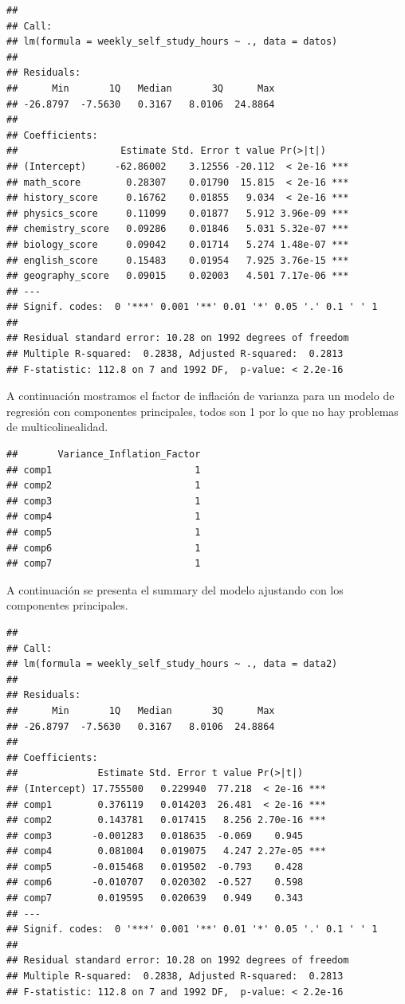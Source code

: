 \documentclass[
]{article}
\begin{document}
\begin{verbatim}
## 
## Call:
## lm(formula = weekly_self_study_hours ~ ., data = datos)
## 
## Residuals:
##      Min       1Q   Median       3Q      Max 
## -26.8797  -7.5630   0.3167   8.0106  24.8864 
## 
## Coefficients:
##                  Estimate Std. Error t value Pr(>|t|)    
## (Intercept)     -62.86002    3.12556 -20.112  < 2e-16 ***
## math_score        0.28307    0.01790  15.815  < 2e-16 ***
## history_score     0.16762    0.01855   9.034  < 2e-16 ***
## physics_score     0.11099    0.01877   5.912 3.96e-09 ***
## chemistry_score   0.09286    0.01846   5.031 5.32e-07 ***
## biology_score     0.09042    0.01714   5.274 1.48e-07 ***
## english_score     0.15483    0.01954   7.925 3.76e-15 ***
## geography_score   0.09015    0.02003   4.501 7.17e-06 ***
## ---
## Signif. codes:  0 '***' 0.001 '**' 0.01 '*' 0.05 '.' 0.1 ' ' 1
## 
## Residual standard error: 10.28 on 1992 degrees of freedom
## Multiple R-squared:  0.2838, Adjusted R-squared:  0.2813 
## F-statistic: 112.8 on 7 and 1992 DF,  p-value: < 2.2e-16
\end{verbatim}

A continuación mostramos el factor de inflación de varianza para un
modelo de regresión con componentes principales, todos son 1 por lo que
no hay problemas de multicolinealidad.

\begin{verbatim}
##       Variance_Inflation_Factor
## comp1                         1
## comp2                         1
## comp3                         1
## comp4                         1
## comp5                         1
## comp6                         1
## comp7                         1
\end{verbatim}

A continuación se presenta el summary del modelo ajustando con los
componentes principales.

\begin{verbatim}
## 
## Call:
## lm(formula = weekly_self_study_hours ~ ., data = data2)
## 
## Residuals:
##      Min       1Q   Median       3Q      Max 
## -26.8797  -7.5630   0.3167   8.0106  24.8864 
## 
## Coefficients:
##              Estimate Std. Error t value Pr(>|t|)    
## (Intercept) 17.755500   0.229940  77.218  < 2e-16 ***
## comp1        0.376119   0.014203  26.481  < 2e-16 ***
## comp2        0.143781   0.017415   8.256 2.70e-16 ***
## comp3       -0.001283   0.018635  -0.069    0.945    
## comp4        0.081004   0.019075   4.247 2.27e-05 ***
## comp5       -0.015468   0.019502  -0.793    0.428    
## comp6       -0.010707   0.020302  -0.527    0.598    
## comp7        0.019595   0.020639   0.949    0.343    
## ---
## Signif. codes:  0 '***' 0.001 '**' 0.01 '*' 0.05 '.' 0.1 ' ' 1
## 
## Residual standard error: 10.28 on 1992 degrees of freedom
## Multiple R-squared:  0.2838, Adjusted R-squared:  0.2813 
## F-statistic: 112.8 on 7 and 1992 DF,  p-value: < 2.2e-16
\end{verbatim}
\end{document}
